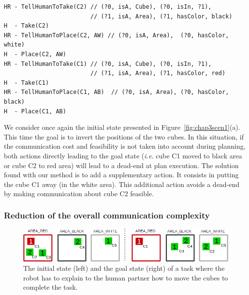 \documentclass[a4paper,11pt,twoside]{StyleThese}
\begin{document}
\begin{lstlisting}[frame=single, basicstyle=\scriptsize\ttfamily, caption={\label{list:case1} The obtained plan for the first case study where cube C1 must be moved from the red to the black area and cube C2 moved from the black to the white area. The lines beginning with H represent the actions of the human and the lines beginning with HR represent actions involving the human and the robot (communication actions). In green are the REG results for each communication action.},captionpos=b, style=customPlan]
HR - TellHumanToTake(C2) // (?0, isA, Cube), (?0, isIn, ?1), 
                         // (?1, isA, Area), (?1, hasColor, black)
H  - Take(C2)
HR - TellHumanToPlace(C2, AW) // (?0, isA, Area),  (?0, hasColor, white)
H  - Place(C2, AW)
HR - TellHumanToTake(C1) // (?0, isA, Cube), (?0, isIn, ?1), 
                         // (?1, isA, Area), (?1, hasColor, red)
H  - Take(C1)
HR - TellHumanToPlace(C1, AB)  // (?0, isA, Area), (?0, hasColor, black)
H  - Place(C1, AB)
\end{lstlisting}

We consider once again the initial state presented in Figure~\ref{fig:chap3scen1}(a). This time the goal is to invert the positions of the two cubes. In this situation, if the communication cost and feasibility is not taken into account during planning, both actions directly leading to the goal state (\textit{i.e.} cube C1 moved to black area or cube C2 to red area) will lead to a dead-end at plan execution.
The solution found with our method is to add a supplementary action. It consists in putting the cube C1 away (in the white area). This additional action avoids a dead-end by making communication about cube C2 feasible.

\subsubsection{Reduction of the overall communication complexity}

\begin{figure}[t!]
\centering
\includegraphics[width=\textwidth]{figures/chapter3/setup2.png}
\caption{\label{fig:case2} The initial state (left) and the goal state (right) of a task where the robot has to explain to the human partner how to move the cubes to complete the task. }
\end{figure}
\end{document}
